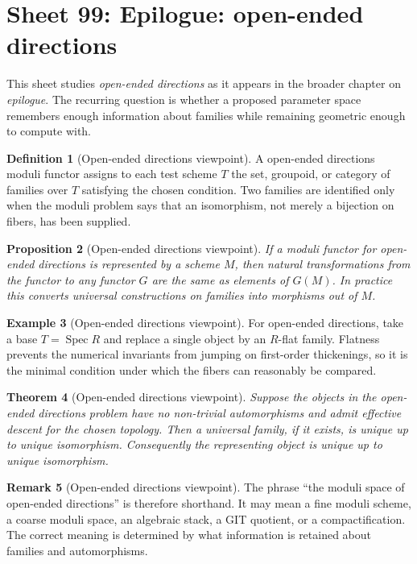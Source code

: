 \documentclass[11pt]{amsart}
\newtheorem{theorem}{Theorem}[section]
\newtheorem{proposition}[theorem]{Proposition}
\theoremstyle{definition}
\newtheorem{definition}[theorem]{Definition}
\newtheorem{example}[theorem]{Example}
\newtheorem{remark}[theorem]{Remark}
\newcommand{\Spec}{\operatorname{Spec}}
\begin{document}
\section{Sheet 99: Epilogue: open-ended directions}
This sheet studies \emph{open-ended directions} as it appears in the broader chapter on \emph{epilogue}.  The recurring question is whether a proposed parameter space remembers enough information about families while remaining geometric enough to compute with.
\begin{definition}[Open-ended directions viewpoint]
A open-ended directions moduli functor assigns to each test scheme $T$ the set, groupoid, or category of families over $T$ satisfying the chosen condition.  Two families are identified only when the moduli problem says that an isomorphism, not merely a bijection on fibers, has been supplied.
\end{definition}
\begin{proposition}[Open-ended directions viewpoint]
If a moduli functor for open-ended directions is represented by a scheme $M$, then natural transformations from the functor to any functor $G$ are the same as elements of $G(M)$.  In practice this converts universal constructions on families into morphisms out of $M$.
\end{proposition}
\begin{example}[Open-ended directions viewpoint]
For open-ended directions, take a base $T=\Spec R$ and replace a single object by an $R$-flat family.  Flatness prevents the numerical invariants from jumping on first-order thickenings, so it is the minimal condition under which the fibers can reasonably be compared.
\end{example}
\begin{theorem}[Open-ended directions viewpoint]
Suppose the objects in the open-ended directions problem have no non-trivial automorphisms and admit effective descent for the chosen topology.  Then a universal family, if it exists, is unique up to unique isomorphism.  Consequently the representing object is unique up to unique isomorphism.
\end{theorem}
\begin{remark}[Open-ended directions viewpoint]
The phrase ``the moduli space of open-ended directions'' is therefore shorthand.  It may mean a fine moduli scheme, a coarse moduli space, an algebraic stack, a GIT quotient, or a compactification.  The correct meaning is determined by what information is retained about families and automorphisms.
\end{remark}
\end{document}
